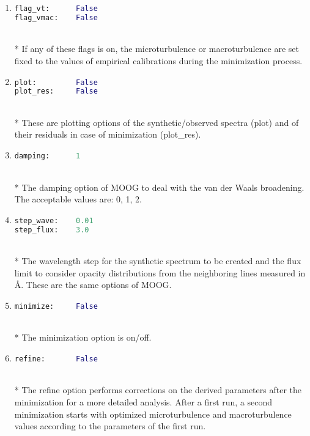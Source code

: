 \documentclass[a4paper,10pt]{article}
\begin{document}
\begin{enumerate}
\item
\begin{lstlisting}[language=Python]
flag_vt:      False 
flag_vmac:    False 
\end{lstlisting} 
\\*
If any of these flags is on, the microturbulence or macroturbulence are set fixed to the values of empirical calibrations during the minimization process.

\item
\begin{lstlisting}[language=Python]
plot:         False 
plot_res:     False 
\end{lstlisting} 
\\*
These are plotting options of the synthetic/observed spectra (plot) and of their residuals in case of minimization (plot\_res).

\item
\begin{lstlisting}[language=Python]
damping:      1 
\end{lstlisting} 
\\*
The damping option of MOOG to deal with the van der Waals broadening. The acceptable values are: 0, 1, 2. 

\item
\begin{lstlisting}[language=Python]
step_wave:    0.01 
step_flux:    3.0 
\end{lstlisting} 
\\*
The wavelength step for the synthetic spectrum to be created and the flux limit to consider opacity distributions from the neighboring lines measured in \AA{}. These are the same options of MOOG.

\item
\begin{lstlisting}[language=Python]
minimize:     False 
\end{lstlisting} 
\\*
The minimization option is on/off.

\item
\begin{lstlisting}[language=Python]
refine:       False 
\end{lstlisting} 
\\*
The refine option performs corrections on the derived parameters after the minimization for a more detailed analysis. After a first run, a second minimization starts with optimized 
microturbulence and macroturbulence values according to the parameters of the first run.


\end{enumerate}
\end{document}
